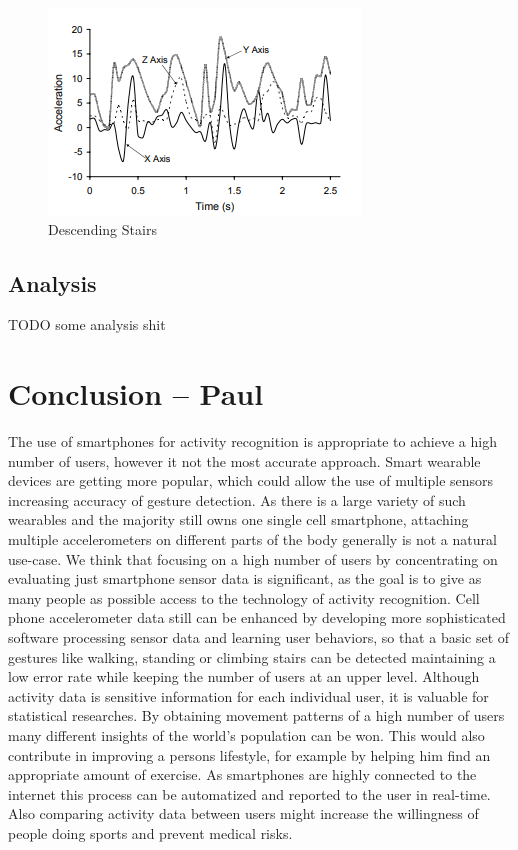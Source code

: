 \documentclass[conference]{IEEEtran}
\begin{document}
\begin{figure}[!htb]
  \includegraphics[width=\linewidth]{descending_stairs.png}
  \caption{Descending Stairs}
  \label{fig:descendingStairs}
\end{figure}

\newpage
\subsection{Analysis}

TODO some analysis shit

\section{Conclusion -- Paul}
The use of smartphones for activity recognition is appropriate to achieve a high number of users, however it not the most accurate approach.
Smart wearable devices are getting more popular, which could allow the use of multiple sensors increasing accuracy of gesture detection. As there is a large variety of such wearables and the majority still owns one single cell smartphone, attaching multiple accelerometers  on different parts of the body generally is not a natural use-case. We think that focusing on a high number of users by concentrating on evaluating just smartphone sensor data is significant, as the goal is to give as many people as possible access to the technology of activity recognition.
Cell phone accelerometer data still can be enhanced by developing more sophisticated software processing sensor data and learning user behaviors, so that a basic set of gestures like walking, standing or climbing stairs can be detected maintaining a low error rate while keeping the number of users at an upper level.
Although activity data is sensitive information for each individual user, it is valuable for statistical researches. By obtaining movement patterns of a high number of users many different insights of the world's population can be won. This would also contribute in improving a persons lifestyle, for example by helping him find an appropriate amount of exercise. As smartphones are highly connected to the internet this process can be automatized and reported to the user in real-time. Also comparing activity data between users might increase the willingness of people doing sports and prevent medical risks.
\end{document}
